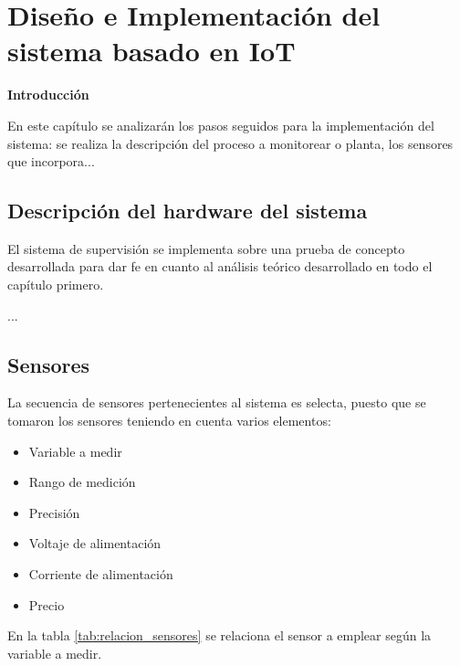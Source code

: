 \chapter{Diseño e Implementación del sistema basado en IoT}\label{cap: }

        \textbf{\Large Introducción}\newline
        
    En este capítulo se analizarán los pasos seguidos para la implementación del sistema: se realiza la descripción del proceso a monitorear o planta, los sensores que incorpora...

\section{Descripción del hardware del sistema}

    El sistema de supervisión se implementa sobre una prueba de concepto desarrollada para dar fe en cuanto al análisis teórico desarrollado en todo el capítulo primero.

    ...

\section{Sensores} \label{sec:sensores}

    La secuencia de sensores pertenecientes al sistema es selecta, puesto que se tomaron los sensores teniendo en cuenta varios elementos:

    \begin{itemize}
        \item Variable a medir
        \item Rango de medición
        \item Precisión
        \item Voltaje de alimentación
        \item Corriente de alimentación
        \item Precio
    \end{itemize}

    En la tabla \ref{tab:relacion_sensores} se relaciona el sensor a emplear según la variable a medir.


